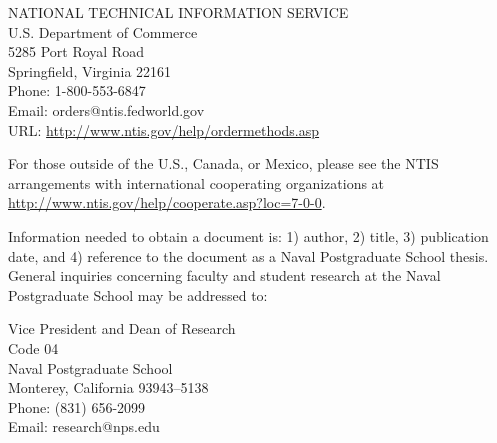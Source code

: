{\vspace{-1em}
\begin{center}
NATIONAL TECHNICAL INFORMATION SERVICE\\
U.S. Department of Commerce\\
5285 Port Royal Road\\
Springfield, Virginia 22161\\
Phone: 1-800-553-6847\\
Email: orders@ntis.fedworld.gov\\
URL: \url{http://www.ntis.gov/help/ordermethods.asp}
\end{center}

\vspace{-1em}
For those outside of the U.S., Canada, or Mexico, please see the NTIS arrangements with international cooperating organizations at \url{http://www.ntis.gov/help/cooperate.asp?loc=7-0-0}.

\vspace{1em}
Information needed to obtain a document is: 1) author, 2) title, 3) publication date, and 4) reference to the document as a Naval Postgraduate School thesis. General inquiries concerning faculty and student research at the Naval Postgraduate School may be addressed to:

\vspace{-1em}
\begin{center}
Vice President and Dean of Research\\
Code 04\\
Naval Postgraduate School\\
Monterey, California 93943--5138\\
Phone: (831) 656-2099\\
Email: research@nps.edu
\end{center}
}